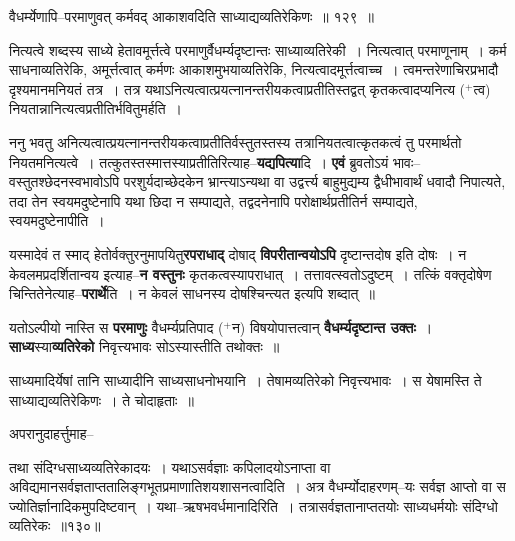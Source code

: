 \documentclass[article,12pt,a4paper]{memoir}
\newcommand{\add}[1]{($^{+}$#1)}
\begin{document}
	वैधर्म्येणापि--परमाणुवत् कर्मवद् आकाशवदिति साध्याद्यव्यतिरेकिणः ॥ १२९ ॥ 
	  
	नित्यत्वे शब्दस्य साध्ये हेतावमूर्त्तत्वे परमाणुर्वैधर्म्यदृष्टान्तः साध्याव्यतिरेकी । नित्यत्वात् परमाणूनाम् । कर्म साधनाव्यतिरेकि, अमूर्त्तत्वात् कर्मणः आकाशमुभयाव्यतिरेकि, नित्यत्वादमूर्त्तत्वाच्च । त्वमन्तरेणाचिरप्रभादौ दृश्यमानमनियतं तत्र । तत्र यथाऽनित्यत्वात्प्रयत्नानन्तरीयकत्वाप्रतीतिस्तद्वत् कृतकत्वादप्यनित्य \add{त्व} नियतान्नानित्यत्वप्रतीतिर्भवितुमर्हति ।
	\pend
      

	  \pstart ननु भवतु अनित्यत्वात्प्रयत्नानन्तरीयकत्वाप्रतीतिर्वस्तुतस्तस्य तत्रानियतत्वात्कृतकत्वं तु परमार्थतो नियतमनित्यत्वे । तत्कुतस्तस्मात्तस्याप्रतीतिरित्याह--\textbf{यद्यपित्या}दि । \textbf{एवं} ब्रुवतोऽयं भावः--वस्तुतश्छेदनस्वभावोऽपि परशुर्यदाच्छेदकेन भ्रान्त्याऽन्यथा वा उद्वर्त्त्य बाहुमुद्यम्य द्वैधीभावार्थं धवादौ निपात्यते, तदा तेन स्वयमदुष्टेनापि यथा छिदा न सम्पाद्यते, तद्वदनेनापि परोक्षार्थप्रतीतिर्न सम्पाद्यते, स्वयमदुष्टेनापीति ।
	\pend
      

	  \pstart यस्मादेवं त \leavevmode{} स्माद् हेतोर्वक्तुरनुमापयितु\textbf{रपराधाद्} दोषाद् \textbf{विपरीतान्वयोऽपि} दृष्टान्तदोष इति दोषः । न केवलमप्रदर्शितान्वय इत्याह--\textbf{न वस्तुनः} कृतकत्वस्यापराधात् । तत्तावत्स्वतोऽदुष्टम् । तत्किं वक्तृदोषेण चिन्तितेनेत्याह--\textbf{परार्थे}ति । न केवलं साधनस्य दोषश्चिन्त्यत इत्यपि शब्दात् ॥
	\pend
      

	  \pstart यतोऽल्पीयो नास्ति स \textbf{परमाणुः} वैधर्म्यप्रतिपाद \add{न} विषयोपात्तत्वान् \textbf{वैधर्म्यदृष्टान्त उक्तः} । \textbf{साध्य}स्या\textbf{व्यतिरेको} निवृत्त्यभावः सोऽस्यास्तीति तथोक्तः ॥
	\pend
	  \bigskip
	  \begingroup
	

	  \pstart साध्यमादिर्येषां तानि साध्यादीनि साध्यसाधनोभयानि । तेषामव्यतिरेको निवृत्त्यभावः । स येषामस्ति ते साध्याद्यव्यतिरेकिणः । ते चोदाहृताः ॥
	\pend
        

	  \pstart अपरानुदाहर्त्तुमाह--
	\pend
        
	  \bigskip
	  \begingroup
	

	  \pstart तथा संदिग्धसाध्यव्यतिरेकादयः । यथाऽसर्वज्ञाः कपिलादयोऽनाप्ता वा अविद्यमानसर्वज्ञताप्ततालिङ्गभूतप्रमाणातिशयशासनत्वादिति । अत्र वैधर्म्योदाहरणम्--यः सर्वज्ञ आप्तो वा स ज्योतिर्ज्ञानादिकमुपदिष्टवान् । यथा--ऋषभवर्धमानादिरिति । तत्रासर्वज्ञतानाप्ततयोः साध्यधर्मयोः संदिग्धो व्यतिरेकः ॥१३०॥
	\pend
      
\end{document}
